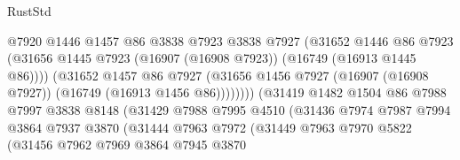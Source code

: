 \begin{lexlean}{RustStd}
\begin{coremodule}
                                      @7920
                                      @1446
                                      @1457
                                      @86
                                      @3838
                                      @7923
                                      @3838
                                      @7927
                                      (@31652
                                        @1446
                                        @86
                                        @7923
                                        (@31656
                                          @1445
                                          @7923
                                          (@16907 (@16908 @7923))
                                          (@16749 (@16913 @1445 @86))))
                                      (@31652
                                        @1457
                                        @86
                                        @7927
                                        (@31656
                                          @1456
                                          @7927
                                          (@16907 (@16908 @7927))
                                          (@16749 (@16913 @1456 @86))))))))
                              (@31419
                                @1482
                                @1504
                                @86
                                @7988
                                @7997
                                @3838
                                @8148
                                (@31429
                                  @7988
                                  @7995
                                  @4510
                                  (@31436
                                    @7974
                                    @7987
                                    @7994
                                    @3864
                                    @7937
                                    @3870
                                    (@31444
                                      @7963
                                      @7972
                                      (@31449
                                        @7963
                                        @7970
                                        @5822
                                        (@31456
                                          @7962
                                          @7969
                                          @3864
                                          @7945
                                          @3870

\end{coremodule}
\end{lexlean}
